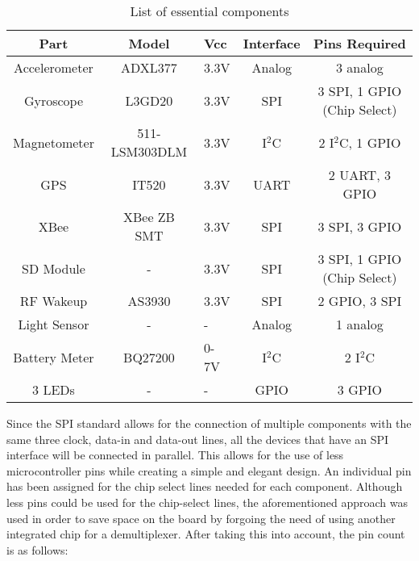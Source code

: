 \begin{table}[H]
\setlength{\extrarowheight}{1.5pt}
  \centering
  \caption{List of essential components}
    \begin{tabular}{|c|c|m{0.35in}|c|c|}
    \hline
    Part  & Model & \centering Vcc & Interface & Pins Required \\
    \hline \hline
    Accelerometer & ADXL377 & \centering 3.3V  & Analog & 3 analog \\ \hline
    Gyroscope & L3GD20 & \centering 3.3V  & SPI   & 3 SPI, 1 GPIO (Chip Select) \\ \hline
    Magnetometer & 511-LSM303DLM & \centering 3.3V  & I$^2$C   & 2 I$^2$C, 1 GPIO \\ \hline
    GPS   & IT520 & \centering 3.3V   & UART  & 2 UART, 3 GPIO \\ \hline 
    XBee  & XBee ZB SMT &\centering 3.3V  & SPI   & 3 SPI, 3 GPIO \\ \hline
    SD Module &   \centering -    & \centering 3.3V  & SPI   & 3 SPI, 1 GPIO (Chip Select) \\ \hline
    RF Wakeup & AS3930 & \centering 3.3V  & SPI   & 2 GPIO, 3 SPI \\ \hline
    Light Sensor & \centering - & \centering - & Analog & 1 analog \\ \hline
    Battery Meter & BQ27200 & 0-7V & \centering I$^2$C & 2 I$^2$C \\ \hline
    3 LEDs & \centering - & \centering - & GPIO & 3 GPIO \\ \hline
    
    \end{tabular}%
  \label{tab:componentPinCount}%
\end{table}%

Since the SPI standard allows for the connection of multiple components with the same three clock, data-in and data-out lines, all the devices that have an SPI interface will be connected in parallel.  This allows for the use of less microcontroller pins while creating a simple and elegant design.  An individual pin has been assigned for the chip select lines needed for each component.  Although less pins could be used for the chip-select lines, the aforementioned approach was used in order to save space on the board by forgoing the need of using another integrated chip for a demultiplexer.  After taking this into account, the pin count is as follows:

